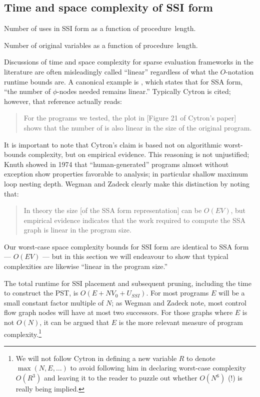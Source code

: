 \documentclass[12pt,titlepage,twoside]{article}
\begin{document}
\subsection{Time and space complexity of SSI form}\label{sec:ssi_complexity}
%
\begin{myfigure}%

\caption{Number of uses in SSI form as a function of
procedure~length.}
\label{fig:ussidata}
\end{myfigure}
\begin{myfigure}%

\caption{Number of original variables as a function of
procedure~length.}
\label{fig:v0data}
\end{myfigure}
Discussions of time and space complexity for sparse evaluation
frameworks in the literature are often misleadingly called ``linear''
regardless of what the $O$-notation runtime bounds are.  A canonical
example is \cite{sreedhar95:lintime}, which states that
for SSA form, ``the number of $\phi$-nodes needed remains linear.''
Typically Cytron \cite{cytron91:ssa} is cited; however, that reference
actually reads:
\begin{quote}
For the programs we tested, the plot in [Figure 21 of Cytron's paper]
shows that the number of  is also linear in the size of
the original program.
\end{quote}
It is important to note that Cytron's claim is based not on
algorithmic worst-bounds complexity, but on empirical evidence.  This
reasoning is not unjustified; Knuth \cite{knuth74:fortran} showed in
1974 that ``human-generated'' programs almost without exception show
properties favorable to analysis; in particular shallow maximum loop
nesting depth.  Wegman and Zadeck \cite{wegman91:scc} clearly make
this distinction by noting that:
\begin{quote}
In theory the size [of the SSA form representation] can be $O(EV)$,
but empirical evidence indicates that the work required to compute the
SSA graph is linear in the program size.
\end{quote}
Our worst-case space complexity bounds for SSI form are identical to
SSA form --- $O(EV)$ --- but in this section we will endeavour to show
that typical complexities are likewise ``linear in the program size.''

The total runtime for SSI placement and subsequent pruning, including
the time to construct the PST, is $O(E + N V_0 + U_{SSI})$.  For most
programs $E$ will be a small constant factor multiple of $N$; as
Wegman and Zadeck \cite{wegman91:scc} note, most control flow graph
nodes will have at most two successors.  For those graphs where $E$ is
not $O(N)$, it can be argued that $E$ is the more relevant measure of
program complexity.\footnote{We will not follow Cytron \cite{cytron91:ssa} in
defining a new variable $R$ to denote $\max(N,E,\ldots)$ to avoid
following him in declaring worst-case complexity $O(R^3)$ and leaving
it to the reader to puzzle out whether $O(N^6)$ (!) is really being implied.}
\end{document}
